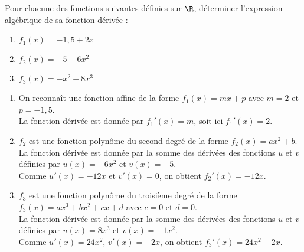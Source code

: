 \documentclass[a4paper,11pt,exos]{nsi} %
\begin{document}

\maketitle

\begin{exercice}
    Pour chacune des fonctions suivantes définies sur $\R$, déterminer l'expression algébrique de sa fonction dérivée :
    \begin{multicols}{2}
        \begin{enumerate}
            \item $f_1(x)=-1{,}5+2x$
        
            \item $f_2(x)= -5-6x^2$
            \item $f_3(x)= -x^2+8x^3$
        \end{enumerate}
    \end{multicols}
    
    \end{exercice}

        \begin{enumerate}
            \item On reconnaît une fonction affine de la forme $f_1(x)=mx+p$ avec $m=2$ et $p=-1{,}5$.\\
            La fonction dérivée est donnée par $f_1'(x)=m$, soit ici $f_1'(x)=2$. 
        
            \item $f_2$ est une fonction polynôme du second degré de la forme $f_2(x)=ax^2+b$.\\
            La fonction dérivée est donnée par la somme des dérivées des fonctions $u$ et $v$ définies par $u(x)=-6x^2$ et $v(x)=-5$.\\
             Comme $u'(x)=-12x$ et $v'(x)=0$, on obtient  $f_2'(x)=-12x$. 
            
            \item $f_3$ est une fonction polynôme du troisième degré de la forme $f_3(x)=ax^3+bx^2+cx+d$ avec $c=0$ et $d=0$.\\
            La fonction dérivée est donnée par la somme des dérivées des fonctions $u$ et $v$  définies par $u(x)=8x^3$ et $v(x)=-1x^2$.\\
             Comme $u'(x)=24x^2$, $v'(x)=-2x$, on obtient  $f_3'(x)=24x^2-2x$. 
        \end{enumerate}
\end{document}
